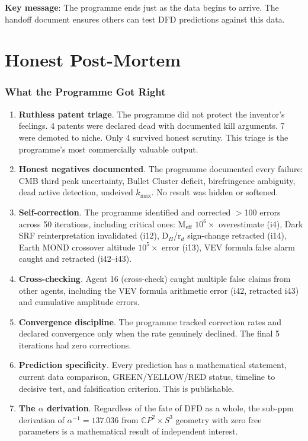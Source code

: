 \documentclass[11pt,a4paper]{article}
\newcommand{\CP}{\mathbb{C}P}
\begin{document}
\textbf{Key message}: The programme ends just as the data begins to arrive. The handoff document ensures others can test DFD predictions against this data.


\part{Honest Post-Mortem}
\label{part:postmortem}

\section{What the Programme Got Right}

\begin{enumerate}
\item \textbf{Ruthless patent triage}. The programme did not protect the inventor's feelings. 4 patents were declared dead with documented kill arguments. 7 were demoted to niche. Only 4 survived honest scrutiny. This triage is the programme's most commercially valuable output.

\item \textbf{Honest negatives documented}. The programme documented every failure: CMB third peak uncertainty, Bullet Cluster deficit, birefringence ambiguity, dead active detection, undeived $k_\text{max}$. No result was hidden or softened.

\item \textbf{Self-correction}. The programme identified and corrected $>$100 errors across 50 iterations, including critical ones: M$_\text{eff}$ $10^6\times$ overestimate (i4), Dark SRF reinterpretation invalidated (i12), D$_H$/r$_d$ sign-change retracted (i14), Earth MOND crossover altitude $10^5\times$ error (i13), VEV formula false alarm caught and retracted (i42--i43).

\item \textbf{Cross-checking}. Agent 16 (cross-check) caught multiple false claims from other agents, including the VEV formula arithmetic error (i42, retracted i43) and cumulative amplitude errors.

\item \textbf{Convergence discipline}. The programme tracked correction rates and declared convergence only when the rate genuinely declined. The final 5 iterations had zero corrections.

\item \textbf{Prediction specificity}. Every prediction has a mathematical statement, current data comparison, GREEN/YELLOW/RED status, timeline to decisive test, and falsification criterion. This is publishable.

\item \textbf{The $\alpha$ derivation}. Regardless of the fate of DFD as a whole, the sub-ppm derivation of $\alpha^{-1} = 137.036$ from $\CP^2 \times S^3$ geometry with zero free parameters is a mathematical result of independent interest.
\end{enumerate}
\end{document}
